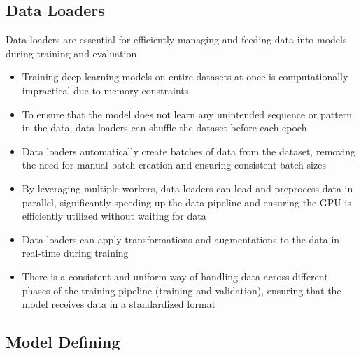 \documentclass[11pt,a4paper]{article}
\begin{document}
\subsection{Data Loaders}
Data loaders are essential for efficiently managing and feeding data into models during training and evaluation
\begin{itemize}
    \item Training deep learning models on entire datasets at once is computationally impractical due to memory constraints
    \item To ensure that the model does not learn any unintended sequence or pattern in the data, data loaders can shuffle the dataset before each epoch
    \item Data loaders automatically create batches of data from the dataset, removing the need for manual batch creation and ensuring consistent batch sizes
    \item By leveraging multiple workers, data loaders can load and preprocess data in parallel, significantly speeding up the data pipeline and ensuring the GPU is efficiently utilized without waiting for data
    \item Data loaders can apply transformations and augmentations to the data in real-time during training
    \item There is a consistent and uniform way of handling data across different phases of the training pipeline (training and validation), ensuring that the model receives data in a standardized format
\end{itemize}
\vspace{0.5cm}


\subsection{Model Defining}
\end{document}
